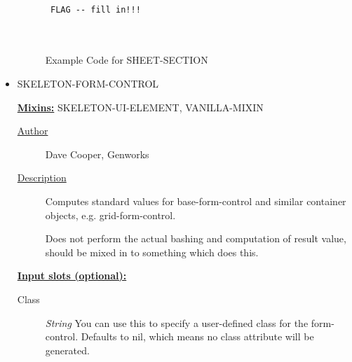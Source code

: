 \documentclass [11pt]{book}
\begin{document}
\begin{itemize}
\begin{figure}
\begin{lrbox}{\boxedverb}
\begin{minipage}{\linewidth}
{\small

\begin{verbatim}

 FLAG -- fill in!!!



\end{verbatim}}
\end{minipage}
\end{lrbox}
\fbox{\usebox{\boxedverb}}

\caption{Example Code for SHEET-SECTION}

\label{fig:example-code-SHEET-SECTION}

\end{figure}






\item {}SKELETON-FORM-CONTROL


\textbf{
\underline{Mixins:}} SKELETON-UI-ELEMENT, VANILLA-MIXIN





\begin{description}

\item [
\underline{Author}]


Dave Cooper, Genworks



\item [
\underline{Description}]


Computes standard values for base-form-control and similar container objects, e.g. grid-form-control.

Does not perform the actual bashing and computation of result value, should be mixed in to something which does this.



\end{description}








\textbf{
\underline{Input slots (optional):}}

\begin{description}

\item [Class]
\emph{String} You can use this to specify a user-defined class for the form-control. Defaults to nil, which means no class attribute will be generated.



\end{description}
\end{itemize}
\end{document}
